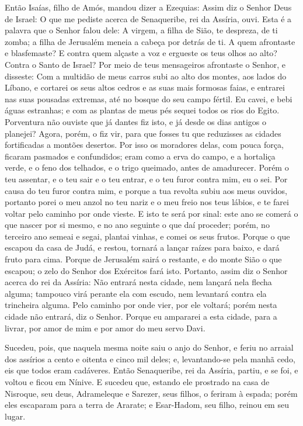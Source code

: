 Então Isaías, filho de Amós, mandou dizer a Ezequias: Assim diz o
Senhor Deus de Israel: O que me pediste acerca de Senaqueribe, rei
da Assíria, ouvi. Esta é a palavra que o Senhor falou dele: A
virgem, a filha de Sião, te despreza, de ti zomba; a filha de
Jerusalém meneia a cabeça por detrás de ti. A quem afrontaste
e blasfemaste? E contra quem alçaste a voz e ergueste os teus olhos
ao alto? Contra o Santo de Israel? Por meio de teus
mensageiros afrontaste o Senhor, e disseste: Com a multidão de meus
carros subi ao alto dos montes, aos lados do Líbano, e cortarei os
seus altos cedros e as suas mais formosas faias, e entrarei nas suas
pousadas extremas, até no bosque do seu campo fértil. Eu
cavei, e bebi águas estranhas; e com as plantas de meus pés sequei
todos os rios do Egito. Porventura não ouviste que já dantes
fiz isto, e já desde os dias antigos o planejei? Agora, porém, o fiz
vir, para que fosses tu que reduzisses as cidades fortificadas a
montões desertos. Por isso os moradores delas, com pouca
força, ficaram pasmados e confundidos; eram como a erva do campo, e
a hortaliça verde, e o feno dos telhados, e o trigo queimado, antes
de amadurecer. Porém o teu assentar, e o teu sair e o teu
entrar, e o teu furor contra mim, eu o sei. Por causa do teu
furor contra mim, e porque a tua revolta subiu aos meus ouvidos,
portanto porei o meu anzol no teu nariz e o meu freio nos teus
lábios, e te farei voltar pelo caminho por onde vieste. E
isto te será por sinal: este ano se comerá o que nascer por si
mesmo, e no ano seguinte o que daí proceder; porém, no terceiro ano
semeai e segai, plantai vinhas, e comei os seus frutos.
Porque o que escapou da casa de Judá, e restou, tornará a
lançar raízes para baixo, e dará fruto para cima. Porque de
Jerusalém sairá o restante, e do monte Sião o que escapou; o zelo do
Senhor dos Exércitos fará isto. Portanto, assim diz o Senhor
acerca do rei da Assíria: Não entrará nesta cidade, nem lançará nela
flecha alguma; tampouco virá perante ela com escudo, nem levantará
contra ela trincheira alguma. Pelo caminho por onde vier, por
ele voltará; porém nesta cidade não entrará, diz o Senhor.
Porque eu ampararei a esta cidade, para a livrar, por amor de
mim e por amor do meu servo Davi.

Sucedeu, pois, que naquela mesma noite saiu o anjo do Senhor, e
feriu no arraial dos assírios a cento e oitenta e cinco mil deles;
e, levantando-se pela manhã cedo, eis que todos eram cadáveres.
Então Senaqueribe, rei da Assíria, partiu, e se foi, e voltou
e ficou em Nínive. E sucedeu que, estando ele prostrado na
casa de Nisroque, seu deus, Adrameleque e Sarezer, seus filhos, o
feriram à espada; porém eles escaparam para a terra de Ararate; e
Esar-Hadom, seu filho, reinou em seu lugar.

